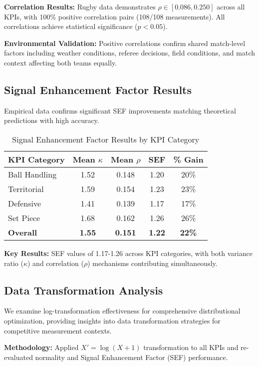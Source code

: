 \textbf{Correlation Results:} Rugby data demonstrates $\rho \in [0.086, 0.250]$ across all KPIs, with 100\% positive correlation pairs (108/108 measurements). All correlations achieve statistical significance ($p < 0.05$).

\textbf{Environmental Validation:} Positive correlations confirm shared match-level factors including weather conditions, referee decisions, field conditions, and match context affecting both teams equally.

\subsection{Signal Enhancement Factor Results}

Empirical data confirms significant SEF improvements matching theoretical predictions with high accuracy.

\begin{table}[h]
\centering
\caption{Signal Enhancement Factor Results by KPI Category}
\begin{tabular}{lcccc}
\hline
\textbf{KPI Category} & \textbf{Mean $\kappa$} & \textbf{Mean $\rho$} & \textbf{SEF} & \textbf{\% Gain} \\
\hline
Ball Handling & 1.52 & 0.148 & 1.20 & 20\% \\
Territorial & 1.59 & 0.154 & 1.23 & 23\% \\
Defensive & 1.41 & 0.139 & 1.17 & 17\% \\
Set Piece & 1.68 & 0.162 & 1.26 & 26\% \\
\hline
\textbf{Overall} & \textbf{1.55} & \textbf{0.151} & \textbf{1.22} & \textbf{22\%} \\
\hline
\end{tabular}
\end{table}

\textbf{Key Results:} SEF values of 1.17-1.26 across KPI categories, with both variance ratio ($\kappa$) and correlation ($\rho$) mechanisms contributing simultaneously.

\subsection{Data Transformation Analysis}

We examine log-transformation effectiveness for comprehensive distributional optimization, providing insights into data transformation strategies for competitive measurement contexts.

\textbf{Methodology:} Applied $X' = \log(X + 1)$ transformation to all KPIs and re-evaluated normality and Signal Enhancement Factor (SEF) performance.

